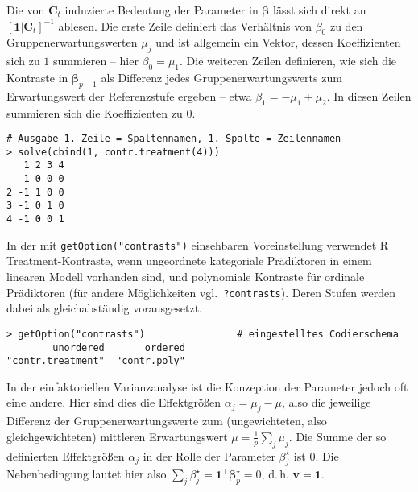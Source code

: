 Die von $\bm{C}_{t}$ induzierte Bedeutung der Parameter in $\bm{\beta}$ lässt sich direkt an $[\bm{1} | \bm{C}_{t}]^{-1}$ ablesen. Die erste Zeile definiert das Verhältnis von $\beta_{0}$ zu den Gruppenerwartungswerten $\mu_{j}$ und ist allgemein ein Vektor, dessen Koeffizienten sich zu $1$ summieren -- hier $\beta_{0} = \mu_{1}$. Die weiteren Zeilen definieren, wie sich die Kontraste in $\bm{\beta}_{p-1}$ als Differenz jedes Gruppenerwartungswerts zum Erwartungswert der Referenzstufe ergeben -- etwa $\beta_{1} = -\mu_{1} + \mu_{2}$. In diesen Zeilen summieren sich die Koeffizienten zu $0$.
\begin{lstlisting}
# Ausgabe 1. Zeile = Spaltennamen, 1. Spalte = Zeilennamen
> solve(cbind(1, contr.treatment(4)))
   1 2 3 4
   1 0 0 0
2 -1 1 0 0
3 -1 0 1 0
4 -1 0 0 1
\end{lstlisting}

In der mit \lstinline!getOption("contrasts")! einsehbaren Voreinstellung verwendet R Treatment-Kontraste, wenn ungeordnete kategoriale Prädiktoren in einem linearen Modell vorhanden sind, und polynomiale Kontraste für ordinale Prädiktoren (für andere Möglichkeiten vgl.\ \lstinline!?contrasts!). Deren Stufen werden dabei als gleichabständig vorausgesetzt.
\begin{lstlisting}
> getOption("contrasts")                # eingestelltes Codierschema
        unordered       ordered
"contr.treatment"  "contr.poly"
\end{lstlisting}

In der einfaktoriellen Varianzanalyse ist die Konzeption der Parameter jedoch oft eine andere. Hier sind dies die Effektgrößen $\alpha_{j} = \mu_{j} - \mu$, also die jeweilige Differenz der Gruppenerwartungswerte zum (ungewichteten, also gleichgewichteten) mittleren Erwartungswert $\mu = \frac{1}{p} \sum_{j} \mu_{j}$. Die Summe der so definierten Effektgrößen $\alpha_{j}$ in der Rolle der Parameter $\beta_{j}^{\star}$ ist $0$. Die Nebenbedingung lautet hier also $\sum_{j} \beta_{j}^{\star} = \bm{1}^{\top} \bm{\beta}_{p}^{\star} = 0$, d.\,h. $\bm{v} = \bm{1}$.

